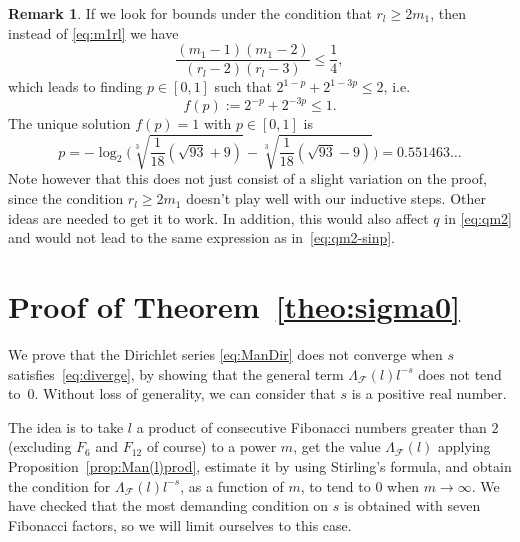 \documentclass[11pt, a4paper]{article}
\newcommand{\manF}{\Lambda_{\mathcal{F}}}
\theoremstyle{plain}
\theoremstyle{definition}
\newtheorem{remark}[theorem]{Remark}
\begin{document}
\begin{remark}
\label{rem:m1}
If we look for bounds under the condition that $r_{l} \geq 2m_{1}$, then instead of \eqref{eq:m1rl} we have
\begin{equation*}
\frac{(m_1-1)(m_1-2)}{(r_l-2)(r_l-3)} \le \frac{1}{4},
\end{equation*}
which leads to finding $p \in [0,1]$ such that $2^{1-p} + 2^{1-3p} \le 2$, i.e.
\begin{equation*}
f(p) := 2^{-p} + 2^{-3p} \le 1.
\end{equation*}
The unique solution $f(p)=1$ with $p \in [0,1]$ is
\[
p = -\log_2\bigg( \sqrt[3]{ \frac{1}{18} (\sqrt{93}+9) }
- \sqrt[3]{ \frac{1}{18} (\sqrt{93}-9)} \bigg)
= 0.551463\dots
\]
Note however that this does not just consist of a slight variation on the proof, since the condition $r_l \ge 2m_1$ doesn't play well with our inductive steps. Other ideas  are needed to get it to work. In addition, this would also affect $q$ in \eqref{eq:qm2} and would not lead to the same expression as in~\eqref{eq:qm2-sinp}.
\end{remark}

\section{Proof of Theorem~\ref{theo:sigma0}}

We prove that the Dirichlet series \eqref{eq:ManDir} does not converge when $s$ satisfies~\eqref{eq:diverge}, by showing that the general term $\manF(l) l^{-s}$ does not tend to~$0$. Without loss of generality, we can consider that $s$ is a positive real number.

The idea is to take $l$ a product of consecutive Fibonacci numbers greater than $2$ (excluding $F_6$ and $F_{12}$ of course) to a power $m$, get the value $\manF(l)$ applying Proposition~\ref{prop:Man(l)prod}, estimate it by using Stirling's formula, and obtain the condition for $\manF(l)l^{-s}$, as a function of $m$, to tend to $0$ when $m\to\infty$. We have checked that the most demanding condition on $s$ is obtained with seven Fibonacci factors, so we will limit ourselves to this case.
\end{document}
